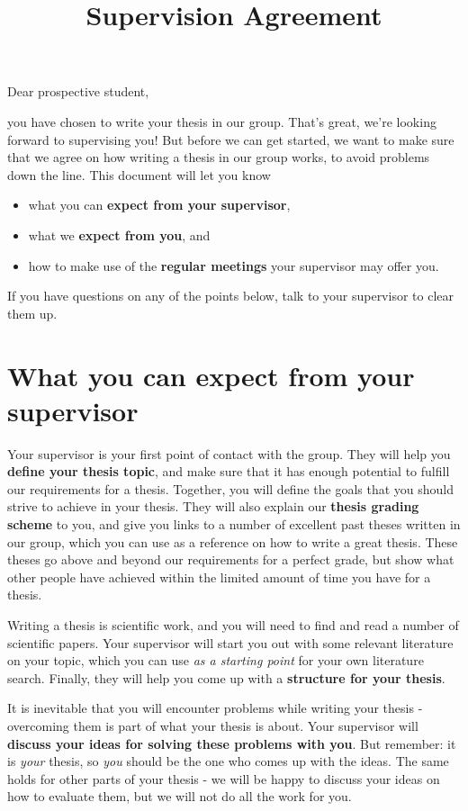 \documentclass[a4paper, 11pt, hidelinks]{article}
\title{Supervision Agreement}
\date{}
\begin{document}
\maketitle

Dear prospective student,

you have chosen to write your thesis in our group. That's great, we're looking forward to supervising you! But before we can get started, we want to make sure that we agree on how writing a thesis in our group works, to avoid problems down the line. This document will let you know
\begin{itemize}
	\item what you can \textbf{expect from your supervisor},
	\item what we \textbf{expect from you}, and
	\item how to make use of the \textbf{regular meetings} your supervisor
	may offer you.
\end{itemize}
If you have questions on any of the points below, talk to your supervisor to clear them up.

\section*{What you can expect from your supervisor}
Your supervisor is your first point of contact with the group.
They will help you \textbf{define your thesis topic}, and make sure that it has enough potential to fulfill our requirements for a thesis.
Together, you will define the goals that you should strive to achieve in your thesis.
They will also explain our \textbf{thesis grading scheme} to you, and give you links to a number of excellent past theses written in our group, which you can use as a reference on how to write a great thesis.
These theses go above and beyond our requirements for a perfect grade, but show what other people have achieved within the limited amount of time you have for a thesis.

Writing a thesis is scientific work, and you will need to find and read a number of scientific papers.
Your supervisor will start you out with some relevant literature on your topic, which you can use \emph{as a starting point} for your own literature search.
Finally, they will help you come up with a \textbf{structure for your thesis}.
	
It is inevitable that you will encounter problems while writing your thesis - overcoming them is part of what your thesis is about. 
Your supervisor will \textbf{discuss your ideas for solving these problems with you}. 
But remember: it is \emph{your} thesis, so \emph{you} should be the one who comes up with the ideas.
The same holds for other parts of your thesis - we will be happy to discuss your ideas on how to evaluate them, but we will not do all the work for you.
\end{document}
